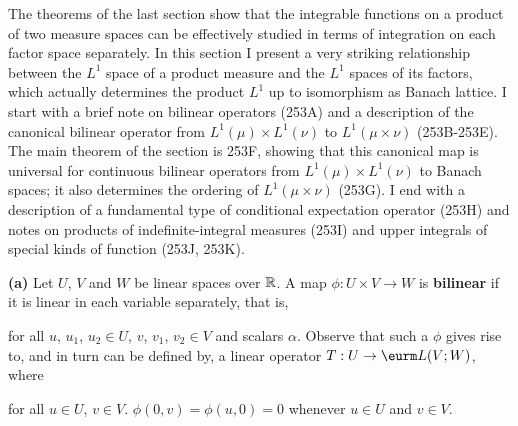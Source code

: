 
\def\chaptername{Product measures}
\def\sectionname{Tensor products}


The theorems of the last section show that the integrable functions on a
product of two measure spaces can be effectively studied in terms of
integration on each factor space separately.   In this section I present
a very striking relationship between the $L^1$ space of a product
measure and the $L^1$ spaces of its factors, which actually determines
the product $L^1$ up to isomorphism as Banach lattice.   I start with a
brief note on bilinear operators (253A) and a description of the canonical
bilinear operator from $L^1(\mu)\times L^1(\nu)$ to $L^1(\mu\times\nu)$
(253B-253E).   The main theorem of the section is 253F, showing that
this canonical map is universal for continuous bilinear operators from
$L^1(\mu)\times L^1(\nu)$ to Banach spaces;  it also determines the
ordering of $L^1(\mu\times\nu)$ (253G).   I end with a description of a
fundamental type of conditional expectation operator (253H) and notes
on products of indefinite-integral measures (253I) and upper integrals
of special kinds of function (253J, 253K).

 {\bf (a)} Let $U$, $V$ and $W$ be linear spaces over
$\Bbb  R$.   A map
$\phi:U\times V\to W$ is {\bf bilinear} if it is linear in each variable
separately, that is,




\noindent for all $u$, $u_1$, $u_2\in U$, $v$, $v_1$, $v_2\in V$ and
scalars $\alpha$.   Observe that such a $\phi$ gives rise to, and in
turn can be defined by, a linear operator
$T:U\to\eurm L(V;W)$, where


\noindent for all $u\in U$, $v\in V$.   $\phi(0,v)=\phi(u,0)=0$ whenever $u\in U$ and
$v\in V$.

